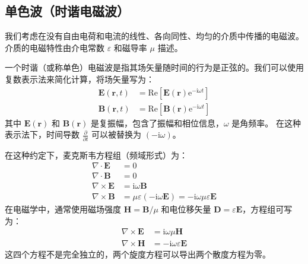 \documentclass[fontset=none]{ctexart}
\begin{document}
\subsection{单色波（时谐电磁波）}
我们考虑在没有自由电荷和电流的线性、各向同性、均匀的介质中传播的电磁波。
介质的电磁特性由介电常数 $\varepsilon$ 和磁导率 $\mu$ 描述。

\begin{definition}[时谐场]
一个时谐（或称单色）电磁波是指其场矢量随时间的行为是正弦的。我们可以使用复数表示法来简化计算，将场矢量写为：
\begin{equation}
\begin{aligned}
\bm{E}(\bm{r}, t) &= \mathrm{Re}[\bm{E}(\bm{r}) \mathrm{e}^{-\mathrm{i}\omega t}] \\
\bm{B}(\bm{r}, t) &= \mathrm{Re}[\bm{B}(\bm{r}) \mathrm{e}^{-\mathrm{i}\omega t}]
\end{aligned}
\end{equation}
其中 $\bm{E}(\bm{r})$ 和 $\bm{B}(\bm{r})$ 是复振幅，包含了振幅和相位信息，$\omega$ 是角频率。
在这种表示法下，时间导数 $\frac{\partial}{\partial t}$ 可以被替换为 $(-\mathrm{i}\omega)$。
\end{definition}

在这种约定下，麦克斯韦方程组（频域形式）为：
\begin{equation}
\begin{aligned}
\nabla \cdot \bm{E} &= 0 \\
\nabla \cdot \bm{B} &= 0 \\
\nabla \times \bm{E} &= \mathrm{i}\omega \bm{B} \\
\nabla \times \bm{B} &= \mu\varepsilon(-\mathrm{i}\omega \bm{E}) = -\mathrm{i}\omega\mu\varepsilon\bm{E}
\end{aligned}
\end{equation}
在电磁学中，通常使用磁场强度 $\bm{H} = \bm{B}/\mu$ 和电位移矢量 $\bm{D} = \varepsilon\bm{E}$，方程组可写为：
\begin{equation}
\begin{aligned}
\nabla \times \bm{E} &= \mathrm{i}\omega\mu\bm{H} \\
\nabla \times \bm{H} &= -\mathrm{i}\omega\varepsilon\bm{E}
\end{aligned}
\end{equation}
这四个方程不是完全独立的，两个旋度方程可以导出两个散度方程为零。
\end{document}

